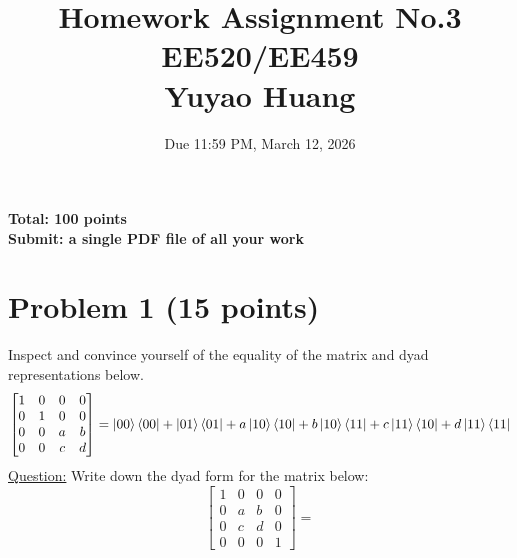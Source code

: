 \documentclass[11pt]{article}
\title{Homework Assignment No.3 \\ EE520/EE459 \\ Yuyao Huang}
\date{Due 11:59 PM, March 12, 2026}
\begin{document}
\maketitle

\textbf{Total: 100 points} \\
\textbf{Submit: a single PDF file of all your work}

\section*{Problem 1 (15 points)}
Inspect and convince yourself of the equality of the matrix and dyad representations below.
\[\begin{bmatrix}1 & 0 & 0 & 0 \\ 0 & 1 & 0 & 0 \\ 0 & 0 & a & b \\ 0 & 0 & c & d \end{bmatrix} = \ket{00}\bra{00} + \ket{01}\bra{01} + a\ket{10}\bra{10} + b\ket{10}\bra{11} + c\ket{11}\bra{10} + d\ket{11}\bra{11}\]
\underline{Question:} Write down the dyad form for the matrix below:
\[\begin{bmatrix}1 & 0 & 0 & 0 \\ 0 & a & b & 0 \\ 0 & c & d & 0 \\ 0 & 0 & 0 & 1 \end{bmatrix} =\]
\end{document}
